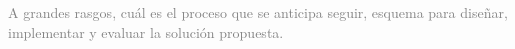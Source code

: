 \documentclass{amsart}
\begin{document}
\noindent \textcolor{gray}{A  grandes  rasgos,  cuál  es  el  proceso  que  se  anticipa  seguir, esquema  para  diseñar,  implementar  y  evaluar  la  solución  propuesta.}
%
%
\end{document}
